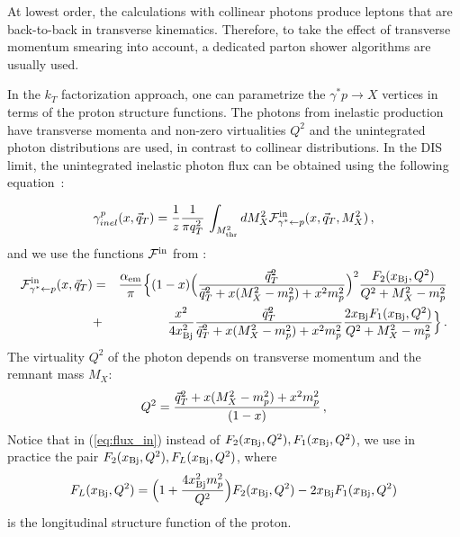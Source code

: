 \documentclass[a4paper,10pt]{article}
\begin{document}
At lowest order, the calculations with collinear photons  produce leptons that are back-to-back in transverse kinematics. 
Therefore, to take the effect of transverse momentum smearing into account, a dedicated parton shower algorithms are usually used.

In the $k_T$ factorization approach, one can parametrize the $\gamma^*p \rightarrow X$ vertices in terms of the proton structure functions. The photons from inelastic production have transverse momenta and non-zero virtualities $Q^2$ and the unintegrated photon distributions are used, in contrast to collinear distributions.
In the DIS limit, the unintegrated inelastic photon flux can be obtained using the following equation~\cite{daSilveira:2014jla, Luszczak:2015aoa}:

\begin{eqnarray}
\gamma^p_{inel}(x,\vec{q}_T) = {1\over z} 
{1 \over \pi q_T^2} \, \int_{M^2_{\rm thr}} dM_X^2 {\cal{F}}^{\mathrm{in}}_{\gamma^* \leftarrow p} (x,\vec{q}_T,M^2_X) \, ,
\end{eqnarray}
and we use the functions $ {\cal{F}}^{\mathrm{in}}$ from \cite{Budnev,WWpaper}:
\begin{eqnarray}
{\cal{F}}^{\mathrm{in}}_{\gamma^* \leftarrow p} (x,\vec{q}_T) &=& {\alpha_{\rm em} \over \pi} 
\Big\{(1-x) \Big( {\vec{q}_T^2 \over \vec{q}_T^2 + x (M_X^2 - m_p^2) + x^2 m_p^2  }\Big)^2  
{F_2(x_{\rm Bj},Q^2) \over Q^2 + M_X^2 - m_p^2}  \nonumber \\
&+& {x^2 \over 4 x^2_{\rm Bj}}  
{\vec{q}_T^2 \over \vec{q}_T^2 + x (M_X^2 - m_p^2) + x^2 m_p^2  }
{2 x_{\rm Bj} F_1(x_{\rm Bj},Q^2) \over Q^2 + M_X^2 - m_p^2} \Big\} \, .
\end{eqnarray}
The virtuality $Q^2$ of the photon depends on transverse momentum and the remnant mass $M_X$:
\begin{eqnarray}
Q^2 =  {\vec{q}_T^2 + x (M_X^2 - m_p^2) + x^2 m_p^2 \over (1-x)} \, ,
\end{eqnarray}
Notice that in (\ref{eq:flux_in}) instead of 
$F_2(x_{\rm Bj},Q^2),F_1(x_{\rm Bj},Q^2)$, 
we use in practice the pair $F_2(x_{\rm Bj},Q^2),F_L(x_{\rm Bj},Q^2)$, where
\begin{eqnarray}
F_L(x_{\rm Bj},Q^2) = \Big( 1 + {4 x_{\rm Bj}^2 m_p^2 \over Q^2} \Big) F_2(x_{\rm Bj},Q^2) - 2 x_{\rm Bj} F_1(x_{\rm Bj},Q^2)
\end{eqnarray}
is the longitudinal structure function of the proton.
\end{document}
